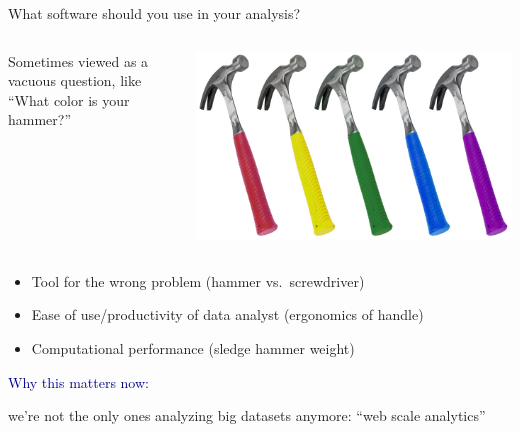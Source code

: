 \documentclass[aspectratio=169]{beamer}
\begin{document}
\begin{frame}{What software should you use in your analysis?}
\large
\vspace{0.75 cm}
\begin{columns}
Sometimes viewed as a vacuous question, like ``What color is your hammer?''

\vspace{0.75 cm}
\includegraphics[width=\linewidth]{hammer.jpg}
\end{columns}

\vspace{0.75 cm}

\large
\vspace{0.1 cm}
\begin{itemize}\setlength{\itemsep}{0.2 cm}
\item<4-> Tool for the wrong problem \hfill (hammer vs.\ screwdriver)
\item<5-> Ease of use/productivity of data analyst \hfill (ergonomics of handle)
\item<6-> Computational performance \hfill (sledge hammer weight)
\end{itemize}
\end{frame}

\begin{frame}{}
\vspace{1 cm}
\begin{center}
\huge \textcolor{darkblue}{Why this matters now:}

\vspace{0.5 cm}
\large we're not the only ones analyzing big datasets anymore: ``web scale analytics''
\end{center}
\end{frame}
\end{document}
